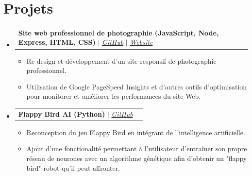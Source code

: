 \documentclass[letterpaper,11pt]{article}
\makeatletter
\newcommand{\resumeItem}[1]{
  \item\small{
    {#1 \vspace{-2pt}}
  }
}
\newcommand{\resumeProjectHeading}[2]{
    \vspace{-2pt}\item
    \begin{tabular*}{0.97\textwidth}{l@{\extracolsep{\fill}}r}
      \small#1 & #2 \\
    \end{tabular*}\vspace{-7pt}
}
\newcommand{\resumeSubHeadingListStart}{\begin{itemize}[leftmargin=0.15in, label={}]}
\newcommand{\resumeSubHeadingListEnd}{\end{itemize}}
\newcommand{\resumeItemListStart}{\begin{itemize}}
\newcommand{\resumeItemListEnd}{\end{itemize}\vspace{-5pt}}
\makeatother
\begin{document}

\section{Projets}
    \vspace{3pt}
    \resumeSubHeadingListStart


      \resumeProjectHeading
        {
          \textbf{
            Site web professionnel de photographie (JavaScript, Node, Express,
            HTML, CSS)
          } $|$ \emph{
            \href{
              https://github.com/lohiermichael/photography-portfolio-site
            }{\color{blue}GitHub}
          } $|$ \emph{
            \href{
              https://laurentxdubois.com
            }{\color{blue}Website}
          }
        }{}
          \resumeItemListStart
            \resumeItem{
              Re-design et développement d'un site responsif de photographie
              professionnel.
            }
            \resumeItem{
              Utilisation de Google PageSpeed Insights et d'autres outils
              d'optimisation pour monitorer et améliorer les performances du
              site Web.
            }
          \resumeItemListEnd

      \resumeProjectHeading
        {
          \textbf{
            Flappy Bird AI (Python)
          } $|$ \emph{
            \href{
              https://github.com/lohiermichael/flappy-bird-ai
            }{\color{blue}GitHub}
          }
        }{}
          \resumeItemListStart
            \resumeItem{
              Reconception du jeu Flappy Bird en intégrant de l'intelligence
              artificielle.
            }
            \resumeItem{
              Ajout d'une fonctionalité permettant à l'utilisateur d'entraîner
              son propre réseau de neurones avec un algorithme génétique afin
              d'obtenir un "flappy bird"-robot qu'il peut affronter.
            }
          \resumeItemListEnd

    \resumeSubHeadingListEnd



\end{document}
